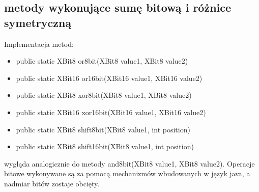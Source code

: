 \subsection{metody wykonujące sumę bitową i różnice symetryczną}
Implementacja metod:
\begin{itemize}  
	\item public static XBit8 or8bit(XBit8 value1, XBit8 value2)
	\item public static XBit16 or16bit(XBit16 value1, XBit16 value2)
	\item public static XBit8 xor8bit(XBit8 value1, XBit8 value2)
	\item public static XBit16 xor16bit(XBit16 value1, XBit16 value2)
	\item public static XBit8 shift8bit(XBit8 value1, int position) 
	\item public static XBit8 shift16bit(XBit8 value1, int position)
\end{itemize}
wygląda analogicznie do metody and8bit(XBit8 value1, XBit8 value2). Operacje bitowe wykonywane są za pomocą mechanizmów wbudowanych w język java, a nadmiar bitów zostaje obcięty.





